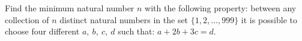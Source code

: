 Find the minimum natural number $n$ with the following property: between any collection of $n$ distinct natural numbers in the set $\{1,2, \dots,999\}$ it is possible to choose four different $a,\ b,\ c,\ d$ such that: $a + 2b + 3c = d$.